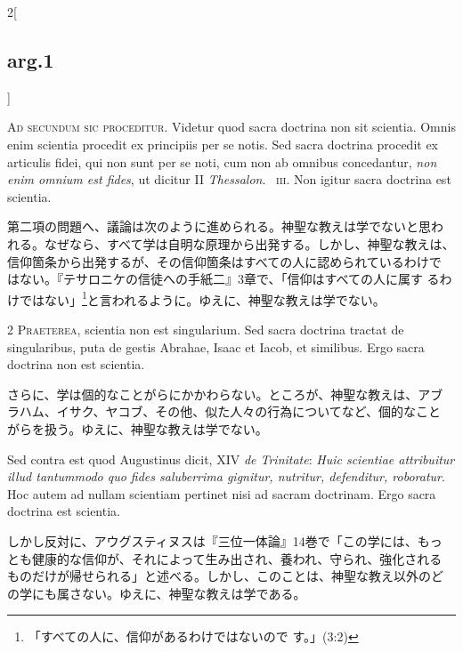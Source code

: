 \documentclass[
paper=a4paper,
fontsize=10pt,
jafontsize=9pt,
titlepage
]{jlreq}
\begin{document}
\begin{paracol}{2}[\subsection{arg.1}]

{\huge A}{\scshape d secundum sic proceditur}. Videtur quod sacra
doctrina non sit scientia. Omnis enim scientia procedit ex principiis
per se notis. Sed sacra doctrina procedit ex articulis fidei, qui non
sunt per se noti, cum non ab omnibus concedantur, {\itshape non enim
omnium est fides}, ut dicitur II {\itshape Thessalon}.~{\scshape
iii}. Non igitur sacra doctrina est scientia.

\switchcolumn

第二項の問題へ、議論は次のように進められる。神聖な教えは学でないと思わ
れる。なぜなら、すべて学は自明な原理から出発する。しかし、神聖な教えは、
信仰箇条から出発するが、その信仰箇条はすべての人に認められているわけで
はない。『テサロニケの信徒への手紙二』3章で、「信仰はすべての人に属す
るわけではない」\footnote{「すべての人に、信仰があるわけではないので
す。」(3:2)}と言われるように。ゆえに、神聖な教えは学でない。


{\scshape 2 Praeterea}, scientia non est singularium. Sed
sacra doctrina tractat de singularibus, puta de gestis Abrahae, Isaac et
Iacob, et similibus. Ergo sacra doctrina non est scientia.

\switchcolumn

さらに、学は個的なことがらにかかわらない。ところが、神聖な教えは、アブ
ラハム、イサク、ヤコブ、その他、似た人々の行為についてなど、個的なこと
がらを扱う。ゆえに、神聖な教えは学でない。

\switchcolumn*[\subsection{s.c.}]

Sed contra est quod Augustinus dicit, XIV {\itshape de Trinitate}:
{\itshape Huic scientiae attribuitur illud tantummodo quo fides
saluberrima gignitur, nutritur, defenditur, roboratur}. Hoc autem ad
nullam scientiam pertinet nisi ad sacram doctrinam. Ergo sacra
doctrina est scientia.

\switchcolumn

しかし反対に、アウグスティヌスは『三位一体論』14巻で「この学には、もっ
とも健康的な信仰が、それによって生み出され、養われ、守られ、強化される
ものだけが帰せられる」と述べる。しかし、このことは、神聖な教え以外のど
の学にも属さない。ゆえに、神聖な教えは学である。


\end{paracol}
\end{document}
